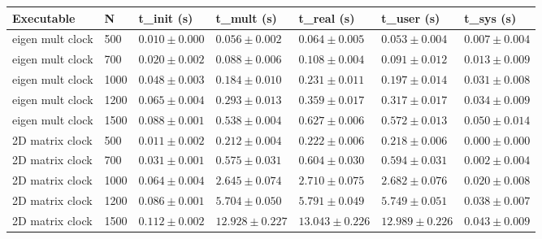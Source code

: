 \begin{table}[h!]   
    \centering
    \begin{tabular}{|l|l|l|l|l|l|l|}    
        \hline
        \textbf{Executable} & \textbf{N} & \textbf{t\_init (s)} & \textbf{t\_mult (s)} & \textbf{t\_real (s)} & \textbf{t\_user (s)} & \textbf{t\_sys (s)} \\
        \hline
        eigen mult clock    & 500   & \(0.010 \pm 0.000\) & \(0.056 \pm 0.002\) & \(0.064 \pm 0.005\) & \(0.053 \pm 0.004\) & \(0.007 \pm 0.004\) \\
        eigen mult clock    & 700   & \(0.020 \pm 0.002\) & \(0.088 \pm 0.006\) & \(0.108 \pm 0.004\) & \(0.091 \pm 0.012\) & \(0.013 \pm 0.009\) \\
        eigen mult clock    & 1000  & \(0.048 \pm 0.003\) & \(0.184 \pm 0.010\) & \(0.231 \pm 0.011\) & \(0.197 \pm 0.014\) & \(0.031 \pm 0.008\) \\
        eigen mult clock    & 1200  & \(0.065 \pm 0.004\) & \(0.293 \pm 0.013\) & \(0.359 \pm 0.017\) & \(0.317 \pm 0.017\) & \(0.034 \pm 0.009\) \\
        eigen mult clock    & 1500  & \(0.088 \pm 0.001\) & \(0.538 \pm 0.004\) & \(0.627 \pm 0.006\) & \(0.572 \pm 0.013\) & \(0.050 \pm 0.014\) \\
        2D matrix clock     & 500   & \(0.011 \pm 0.002\) & \(0.212 \pm 0.004\) & \(0.222 \pm 0.006\) & \(0.218 \pm 0.006\) & \(0.000 \pm 0.000\) \\
        2D matrix clock     & 700   & \(0.031 \pm 0.001\) & \(0.575 \pm 0.031\) & \(0.604 \pm 0.030\) & \(0.594 \pm 0.031\) & \(0.002 \pm 0.004\) \\
        2D matrix clock     & 1000  & \(0.064 \pm 0.004\) & \(2.645 \pm 0.074\) & \(2.710 \pm 0.075\) & \(2.682 \pm 0.076\) & \(0.020 \pm 0.008\) \\
        2D matrix clock     & 1200  & \(0.086 \pm 0.001\) & \(5.704 \pm 0.050\) & \(5.791 \pm 0.049\) & \(5.749 \pm 0.051\) & \(0.038 \pm 0.007\) \\
        2D matrix clock     & 1500  & \(0.112 \pm 0.002\) & \(12.928 \pm 0.227\) & \(13.043 \pm 0.226\) & \(12.989 \pm 0.226\) & \(0.043 \pm 0.009\) \\
        \hline 
    \end{tabular}
\end{table}

